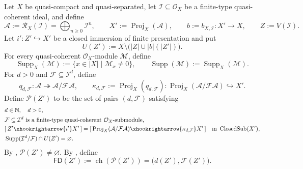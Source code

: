 \begin{definition}
  \label{def:nagata-proj-closed-center-finite-degree}

  Let $X$ be quasi-compact and quasi-separated, let
  $\mathcal I\subseteq\mathcal O_X$ be a finite-type quasi-coherent ideal,
  and define
  \[
    \mathcal A:=\mathcal R_X(\mathcal I)
      =\bigoplus_{n\ge0}\mathcal I^n,\qquad
    X':=\operatorname{Proj}_X(\mathcal A),\qquad
    b:=b_{X,\mathcal I}\colon X'\to X,\qquad
    Z:=V(\mathcal I).
  \]
  Let $i'\colon Z'\hookrightarrow X'$ be a closed immersion of finite
  presentation and put
  \[
    U(Z'):=X\setminus\bigl(|Z|\cup |b|(|Z'|)\bigr).
  \]
  For every quasi-coherent $\mathcal O_X$-module $\mathcal M$, define
  \[
    \operatorname{Supp}_X(\mathcal M)
      :=\{x\in|X|\mid\mathcal M_x\neq0\},
    \qquad
    \operatorname{Supp}(\mathcal M):=
      \operatorname{Supp}_X(\mathcal M).                           \tag{FD0}
  \]
  For $d>0$ and
  $\mathcal F\subseteq\mathcal I^d$, define
  \[
    q_{d,\mathcal F}\colon\mathcal A\twoheadrightarrow
      \mathcal A/\mathcal F\mathcal A,
    \qquad
    \kappa_{d,\mathcal F}:=
      \operatorname{Proj}_X(q_{d,\mathcal F})\colon
      \operatorname{Proj}_X(\mathcal A/\mathcal F\mathcal A)
        \hookrightarrow X'.                                      \tag{FD1}
  \]
  Define $\mathcal P(Z')$ to be the set of pairs $(d,\mathcal F)$ satisfying
  \[
  \begin{aligned}
    &d\in\mathbb N,\quad d>0,\\
    &\mathcal F\subseteq\mathcal I^d
      \text{ is a finite-type quasi-coherent }\mathcal O_X\text{-submodule},\\
    &[\,Z'\xhookrightarrow{i'}X'\,]
      =[\,\operatorname{Proj}_X
        (\mathcal A/\mathcal F\mathcal A)
        \xhookrightarrow{\kappa_{d,\mathcal F}}X'\,]
      \quad\text{in }\operatorname{ClosedSub}(X'),\\
    &\operatorname{Supp}(\mathcal I^d/\mathcal F)\cap U(Z')=\varnothing.
  \end{aligned}
  \]
  By \cite[Tag 0803]{stacks-project}, $\mathcal P(Z')\ne\varnothing$.  By
  , define
  \[
    \mathsf{FD}(Z'):=
      \operatorname{ch}(\mathcal P(Z'))
      =\bigl(d(Z'),\mathcal F(Z')\bigr).
  \]
\end{definition}

